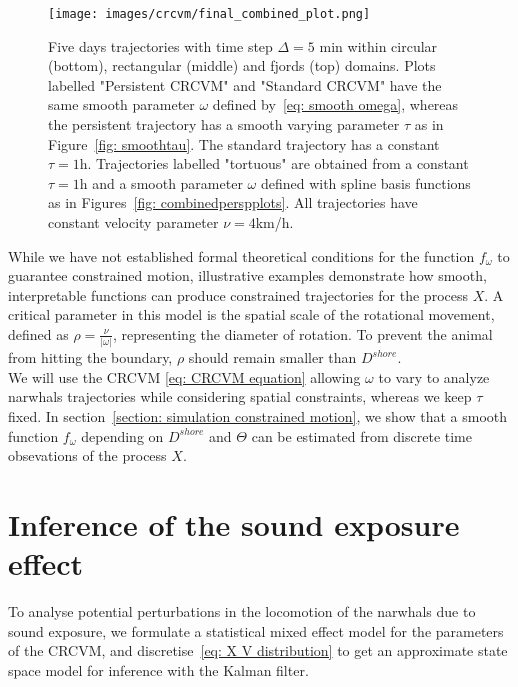 \documentclass[aoas]{imsart}
\theoremstyle{definition}
\theoremstyle{remark}
\theoremstyle{remark}
\newcommand {\1}{\mathbb{1}}
\begin{document}
\begin{figure}[ht!]
	\texttt{[image: images/crcvm/final\_combined\_plot.png]}

	\caption{Five days trajectories with time step $\Delta=5$ min within circular (bottom), rectangular (middle) and fjords (top) domains. Plots labelled "Persistent CRCVM" and "Standard CRCVM" have the same smooth parameter $\omega$ defined by~\eqref{eq: smooth omega}, whereas the persistent trajectory has a smooth varying parameter $\tau$ as in Figure~\ref{fig: smoothtau}. The standard trajectory has a constant $\tau =1$h. Trajectories labelled "tortuous" are obtained from a constant $\tau=1$h and a smooth parameter $\omega$ defined with spline basis functions as in Figures~\ref{fig: combinedperspplots}. All trajectories have constant velocity parameter $\nu=4$km/h.}
 \label{fig: crcvm examples}
\end{figure}



While we have not established formal theoretical conditions for the function $f_{\omega}$ to guarantee constrained motion,   illustrative examples demonstrate how smooth, interpretable functions can produce constrained trajectories for the process $X$. A critical parameter in this model is the spatial scale of the rotational movement, defined as $\rho=\frac{\nu}{\vert \omega \vert}$, representing the diameter of rotation. To prevent the animal from hitting the boundary, $\rho$ should remain smaller than $D^{shore}$.\\


We will use the CRCVM \eqref{eq: CRCVM equation} allowing $\omega$ to vary to analyze narwhals trajectories while considering spatial constraints, whereas we keep $\tau$ fixed. In section~\ref{section: simulation constrained motion}, we show that a smooth function $f_{\omega}$ depending on $D^{shore}$ and $\Theta$ can be estimated from discrete time obsevations of the process $X$.




\section{Inference of the sound exposure effect}

To analyse potential perturbations in the locomotion of the narwhals due to sound exposure, we formulate a statistical mixed effect model for the parameters of the CRCVM, and discretise~\eqref{eq: X V distribution} to get an approximate state space model for inference with the Kalman filter.
\end{document}
